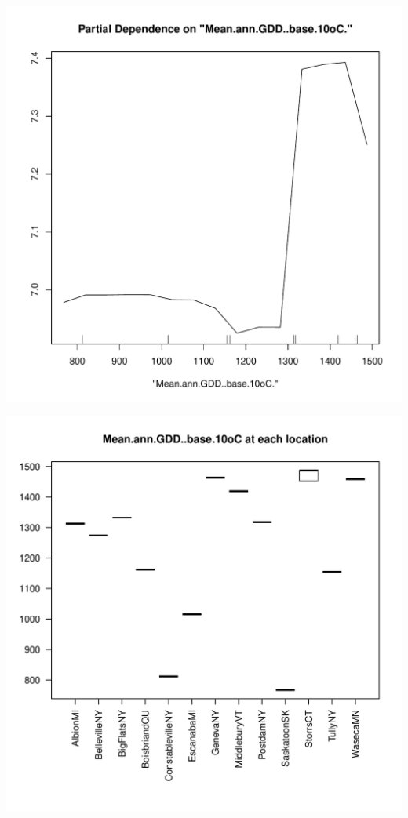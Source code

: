 \documentclass{article}\usepackage[]{graphicx}\usepackage[]{color}
\makeatletter
\def\maxwidth{ %
  \ifdim\Gin@nat@width>\linewidth
    \linewidth
  \else
    \Gin@nat@width
  \fi
}
\newenvironment{knitrout}{}{} %
\makeatother
\begin{document}
\begin{knitrout}
\color{fgcolor}

{\centering \includegraphics[width=\maxwidth]{figure/AdditionalPartialDependence-1} 

}




{\centering \includegraphics[width=\maxwidth]{figure/AdditionalPartialDependence-2} 

}



\end{knitrout}
\end{document}
